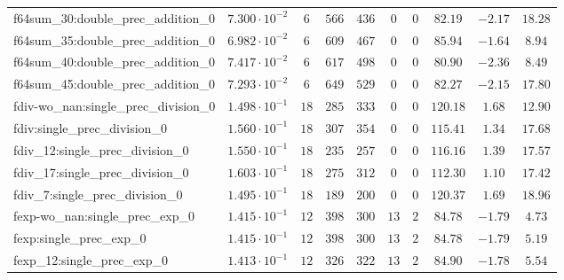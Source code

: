 \begin{tabular}{|l|c|c|c|c|c|c|c|c|c|}
f64sum\_30:double\_prec\_addition\_0           & $ 7.300 \cdot 10^{-2} $ & $ 6      $ & $ 566    $ & $ 436   $ & $ 0   $ & $ 0  $ & $ 82.19       $ & $ -2.17   $ & $ 18.28   $ \\
f64sum\_35:double\_prec\_addition\_0           & $ 6.982 \cdot 10^{-2} $ & $ 6      $ & $ 609    $ & $ 467   $ & $ 0   $ & $ 0  $ & $ 85.94       $ & $ -1.64   $ & $ 8.94    $ \\
f64sum\_40:double\_prec\_addition\_0           & $ 7.417 \cdot 10^{-2} $ & $ 6      $ & $ 617    $ & $ 498   $ & $ 0   $ & $ 0  $ & $ 80.90       $ & $ -2.36   $ & $ 8.49    $ \\
f64sum\_45:double\_prec\_addition\_0           & $ 7.293 \cdot 10^{-2} $ & $ 6      $ & $ 649    $ & $ 529   $ & $ 0   $ & $ 0  $ & $ 82.27       $ & $ -2.15   $ & $ 17.80   $ \\
fdiv-wo\_nan:single\_prec\_division\_0         & $ 1.498 \cdot 10^{-1} $ & $ 18     $ & $ 285    $ & $ 333   $ & $ 0   $ & $ 0  $ & $ 120.18      $ & $ 1.68    $ & $ 12.90   $ \\
fdiv:single\_prec\_division\_0                 & $ 1.560 \cdot 10^{-1} $ & $ 18     $ & $ 307    $ & $ 354   $ & $ 0   $ & $ 0  $ & $ 115.41      $ & $ 1.34    $ & $ 17.68   $ \\
fdiv\_12:single\_prec\_division\_0             & $ 1.550 \cdot 10^{-1} $ & $ 18     $ & $ 235    $ & $ 257   $ & $ 0   $ & $ 0  $ & $ 116.16      $ & $ 1.39    $ & $ 17.57   $ \\
fdiv\_17:single\_prec\_division\_0             & $ 1.603 \cdot 10^{-1} $ & $ 18     $ & $ 275    $ & $ 312   $ & $ 0   $ & $ 0  $ & $ 112.30      $ & $ 1.10    $ & $ 17.42   $ \\
fdiv\_7:single\_prec\_division\_0              & $ 1.495 \cdot 10^{-1} $ & $ 18     $ & $ 189    $ & $ 200   $ & $ 0   $ & $ 0  $ & $ 120.37      $ & $ 1.69    $ & $ 18.96   $ \\
fexp-wo\_nan:single\_prec\_exp\_0              & $ 1.415 \cdot 10^{-1} $ & $ 12     $ & $ 398    $ & $ 300   $ & $ 13  $ & $ 2  $ & $ 84.78       $ & $ -1.79   $ & $ 4.73    $ \\
fexp:single\_prec\_exp\_0                      & $ 1.415 \cdot 10^{-1} $ & $ 12     $ & $ 398    $ & $ 300   $ & $ 13  $ & $ 2  $ & $ 84.78       $ & $ -1.79   $ & $ 5.19    $ \\
fexp\_12:single\_prec\_exp\_0                  & $ 1.413 \cdot 10^{-1} $ & $ 12     $ & $ 326    $ & $ 322   $ & $ 13  $ & $ 2  $ & $ 84.90       $ & $ -1.78   $ & $ 5.54    $ \\

\end{tabular}
